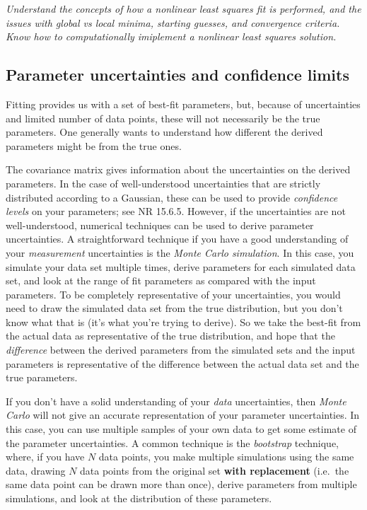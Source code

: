 \documentclass[12pt]{article}
\begin{document}
\colorbox{hl}{\parbox{0.9\textwidth}
{\emph{Understand the concepts of how a nonlinear least squares fit is
performed, and the issues with global vs local minima,
starting guesses, and convergence criteria. Know how to
computationally imiplement a nonlinear least squares solution.}}}



\subsection{Parameter uncertainties and confidence limits}
Fitting provides us with a set of best-fit parameters, but, because
of uncertainties and limited number of data points, these will not
necessarily be the true parameters. One generally wants to understand
how different the derived parameters might be from the true ones.

The covariance matrix gives information about the uncertainties on
the derived parameters. In the case of well-understood uncertainties
that are strictly distributed according to a Gaussian, these can be
used to provide \emph{confidence levels} on your parameters;
see NR 15.6.5. However, if the uncertainties are not well-understood,
numerical techniques can be used to derive parameter uncertainties.
A straightforward technique if you have a good understanding of your
\emph{measurement} uncertainties is the \emph{Monte Carlo
simulation}. In this case, you simulate your data set multiple
times, derive parameters for each simulated data set, and look at
the range of fit parameters as compared with the input parameters.
To be completely representative of your uncertainties, you would
need to draw the simulated data set from the true distribution,
but you don't know what that is (it's what you're trying to derive).
So we take the best-fit from the actual data as representative of the
true distribution,
and hope that the \emph{difference} between the derived parameters
from the simulated sets and the input parameters is representative
of the difference between the actual data set and the true parameters.

If you don't have a solid understanding of your \emph{data}
uncertainties, then \emph{Monte Carlo} will not give an accurate
representation of your parameter uncertainties. In this case,
you can use multiple samples of your own data to get some estimate
of the parameter uncertainties. A common technique is the
\emph{bootstrap} technique, where, if you have $N$ data points,
you make multiple simulations using the same data, drawing $N$
data points from the original set \- \textbf{with replacement}
(i.e.\ the same data point can be drawn more than once), derive
parameters from multiple simulations, and look at the distribution
of these parameters.
\end{document}

